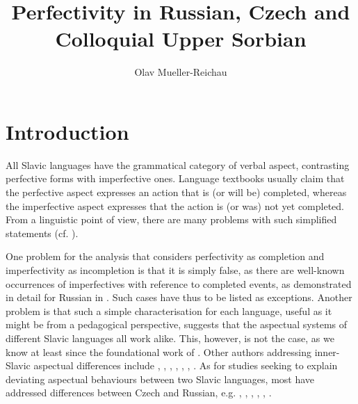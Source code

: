 \documentclass[output=paper,colorlinks,citecolor=brown]{langscibook}
\author{Olav Mueller-Reichau\affiliation{Leipzig University}}
\title{Perfectivity in Russian, Czech and Colloquial Upper Sorbian}
\begin{document}


\maketitle


\section{Introduction}\label{mueller:sec:intro}
All Slavic languages have the grammatical category of verbal aspect, contrasting perfective forms with imperfective ones. Language textbooks usually claim that the perfective aspect expresses an action that is (or will be) completed, whereas the imperfective aspect expresses that the action is (or was) not yet completed. From a linguistic point of view, there are many problems with such simplified statements (cf. \citealt[18]{mue:Comrie1976}).

One problem for the analysis that considers perfectivity as completion and imperfectivity as incompletion is that it is simply false, as there are well-known occurrences of imperfectives with reference to completed events, as demonstrated in detail for Russian in \citet{Gronn2004}. Such cases have thus to be listed as exceptions. Another problem is that such a simple characterisation for each language, useful as it might be from a pedagogical perspective, suggests that the aspectual systems of different Slavic languages all work alike. This, however, is not the case, as we know at least since the foundational work of \citet{mue:Dickey2000}. 
Other authors addressing inner-Slavic aspectual differences include \citet{Alvestad13},
\citet{Arregui14}, \citet{Breu00}, \citet{Klimek22},
\citet{Petruchina2000}, \citet{Rivero10}, 
\citet{Wiemer08}.  
As for studies seeking to explain deviating aspectual behaviours between two Slavic languages, most have addressed differences between Czech and Russian, e.g. 
\citet{Berger13}, \citet{Berger16}, 
\citet{Gehrke22},
\citet{Heck18},
\citet{omr18},
\citet{Stunova1991, Stunova1993}.
\end{document}
